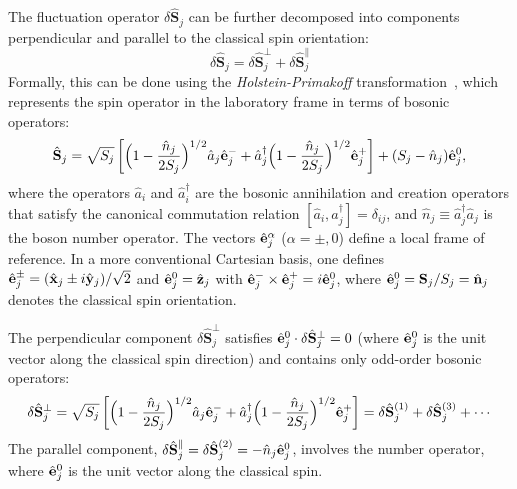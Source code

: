 The fluctuation operator $\delta \hat{\mathbf{S}}_{j}$ can be further decomposed into components perpendicular and parallel to the classical spin orientation:
\begin{equation}
    \delta \hat{\mathbf{S}}_{j} = \delta \hat{\mathbf{S}}_{j}^{\perp} + \delta \hat{\mathbf{S}}_{j}^{\parallel} 
\end{equation}
Formally, this can be done using the \emph{Holstein-Primakoff} transformation~\cite{PhysRev.58.1098}, which represents the spin operator in the laboratory frame in terms of bosonic operators:
\begin{equation}
    \hat{\bf S}_{j} 
    = \sqrt{S_{j}} 
    \left[ 
    \Big( 1 - \frac{\hat{n}_{j}}{2S_{j}} \Big)^{1/2} \hat{a}_{j} \hat{\bf e}_{j}^{-} + 
    \hat{a}_{j}^{\dagger} \Big( 1 - \frac{\hat{n}_{j}}{2S_{j}} \Big)^{1/2} \hat{\bf e}_{j}^{+}
    \right]
    + (S_{j} - \hat{n}_{j}) \hat{\bf e}_{j}^{0},
\end{equation}
where the operators $\hat{a}_{i}$ and $\hat{a}_{i}^{\dagger}$ are the bosonic annihilation and creation operators that satisfy the canonical commutation relation $[\hat{a}_{i}, \hat{a}_{j}^{\dagger}] = \delta_{ij}$, and $\hat{n}_{j} \equiv \hat{a}^{\dagger}_{j} \hat{a}_{j}$ is the boson number operator. 
The vectors $\hat{\bf e}_{j}^{\alpha}$ ($\alpha = \pm, 0$) define a local frame of reference. In a more conventional Cartesian basis, one defines $\hat{\bf e}_{j}^{\pm} = (\hat{\bf x}_{j} \pm i \hat{\bf y}_{j})/\sqrt{2}$ and $\hat{\bf e}_{j}^{0} = \hat{\bf z}_{j}$ with $\hat{\bf e}_{j}^{-} \times \hat{\bf e}_{j}^{+} = i \hat{\bf e}_{j}^{0}$, where $\hat{\bf e}^{0}_{j} = {\bf S}_{j} / {S_{j}} = \hat{\bf n}_{j}$ denotes the classical spin orientation.

The perpendicular component $ \delta \hat{\mathbf{S}}_{j}^{\perp}$ satisfies $ \hat{\bf e}_{j}^{0} \cdot \delta \hat{\mathbf{S}}_{j}^{\perp} = 0 $ (where $\hat{\bf e}_{j}^{0}$ is the unit vector along the classical spin direction) and contains only odd-order bosonic operators: 
\begin{equation}
    \delta \hat{\mathbf{S}}_{j}^{\perp} = \sqrt{S_{j}}\left[ 
    \Big( 1 - \frac{\hat{n}_{j}}{2S_{j}} \Big)^{1/2} \hat{a}_{j} \hat{\bf e}_{j}^{-} + 
    \hat{a}_{j}^{\dagger} \Big( 1 - \frac{\hat{n}_{j}}{2S_{j}} \Big)^{1/2} \hat{\bf e}_{j}^{+}
    \right] 
    = \delta \hat{\mathbf{S}}_{j}^{(1)} + \delta \hat{\mathbf{S}}_{j}^{(3)} + \cdots 
\end{equation}
The parallel component, $\delta \hat{\mathbf{S}}_{j}^{\parallel} = \delta \hat{\mathbf{S}}_{j}^{(2)} = -\hat{n}_{j} \hat{\bf e}_{j}^{0}$, involves the number operator, where $\hat{\bf e}_{j}^{0}$ is the unit vector along the classical spin.

